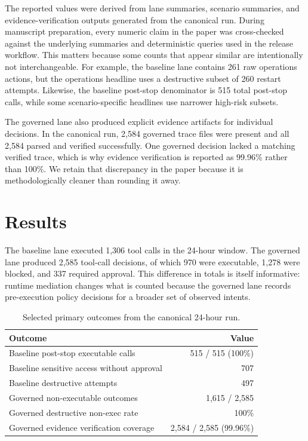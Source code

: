 \documentclass[letterpaper]{article}
\begin{document}
The reported values were derived from lane summaries, scenario summaries, and evidence-verification outputs generated from the canonical run. During manuscript preparation, every numeric claim in the paper was cross-checked against the underlying summaries and deterministic queries used in the release workflow. This matters because some counts that appear similar are intentionally not interchangeable. For example, the baseline lane contains 261 raw operations actions, but the operations headline uses a destructive subset of 260 restart attempts. Likewise, the baseline post-stop denominator is 515 total post-stop calls, while some scenario-specific headlines use narrower high-risk subsets.

The governed lane also produced explicit evidence artifacts for individual decisions. In the canonical run, 2,584 governed trace files were present and all 2,584 parsed and verified successfully. One governed decision lacked a matching verified trace, which is why evidence verification is reported as 99.96\% rather than 100\%. We retain that discrepancy in the paper because it is methodologically cleaner than rounding it away.

\section{Results}

The baseline lane executed 1,306 tool calls in the 24-hour window. The governed lane produced 2,585 tool-call decisions, of which 970 were executable, 1,278 were blocked, and 337 required approval. This difference in totals is itself informative: runtime mediation changes what is counted because the governed lane records pre-execution policy decisions for a broader set of observed intents.

\begin{table}[t]
\centering
\footnotesize
\begin{tabular}{@{}p{}r@{}}
\hline
Outcome & Value \\
\hline
Baseline post-stop executable calls & 515 / 515 (100\%) \\
Baseline sensitive access without approval & 707 \\
Baseline destructive attempts & 497 \\
Governed non-executable outcomes & 1,615 / 2,585 \\
Governed destructive non-exec rate & 100\% \\
Governed evidence verification coverage & 2,584 / 2,585 (99.96\%) \\
\hline
\end{tabular}
\caption{Selected primary outcomes from the canonical 24-hour run.}
\label{tab:primary}
\end{table}
\end{document}
